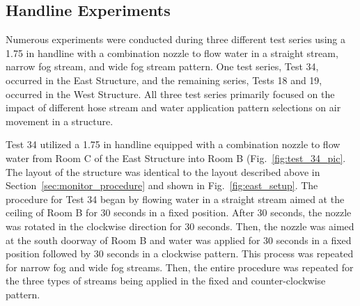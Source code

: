 \documentclass[12pt,oneside]{book}
\begin{document}
\subsection{Handline Experiments}
\label{sec:handline_procedure}
Numerous experiments were conducted during three different test series using a 1.75 in handline with a combination nozzle to flow water in a straight stream, narrow fog stream, and wide fog stream pattern. One test series, Test 34, occurred in the East Structure, and the remaining series, Tests 18 and 19, occurred in the West Structure. All three test series primarily focused on the impact of different hose stream and water application pattern selections on air movement in a structure. 

Test 34 utilized a 1.75 in handline equipped with a combination nozzle to flow water from Room C of the East Structure into Room B (Fig.~\ref{fig:test_34_pic}. The layout of the structure was identical to the layout described above in Section~\ref{sec:monitor_procedure} and shown in Fig.~\ref{fig:east_setup}. The procedure for Test 34 began by flowing water in a straight stream aimed at the ceiling of Room B for 30 seconds in a fixed position. After 30 seconds, the nozzle was rotated in the clockwise direction for 30 seconds. Then, the nozzle was aimed at the south doorway of Room B and water was applied for 30 seconds in a fixed position followed by 30 seconds in a clockwise pattern. This process was repeated for narrow fog and wide fog streams. Then, the entire procedure was repeated for the three types of streams being applied in the fixed and counter-clockwise pattern.
\end{document}
